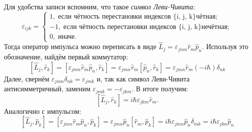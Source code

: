 Для удобства записи вспомним, что такое \textit{символ Леви-Чивита}:
\[
\varepsilon_{ijk} = 
\begin{cases}
    1,\; \text{если чётность перестановки индексов \{i, j, k\} чётная};\\
    -1,\;\text{если чётность перестановки индексов \{i, j, k\} нечётная}; \\
    0,\;\text{иначе}.
\end{cases}
\]
Тогда оператор импульса можно переписать в виде $\hat{L}_j = \varepsilon_{jmn} \hat{r}_m \hat{p}_n$. Используя это обозначение, найдём первый коммутатор:
\[
    [\hat{L}_j, \hat{r}_k] = [\varepsilon_{jmn} \hat{r}_m \hat{p}_n, \hat{r}_k] = \varepsilon_{jmn} \hat{r}_m [\hat{p}_n, \hat{r}_k] = \varepsilon_{jmn}\hat{r}_m(-i\hbar)\delta_{nk}
\]
Далее, свернём $\varepsilon_{jmn}\delta_{nk} = \varepsilon_{jmk}$ и, так как символ Леви-Чивита антисимметричный, заменим $\varepsilon_{jmk} = -\varepsilon_{jkm}$. В итоге получим:
\[
[\hat{L}_j, \hat{r}_k] = i\hbar\varepsilon_{jkm}\hat{r}_m.
\]
Аналогично с импульсом:
\[
[\hat{L}_j, \hat{p}_k] = [\varepsilon_{jmn} \hat{r}_m \hat{p}_n, \hat{p}_k] = \varepsilon_{jmn} \hat{p}_n [\hat{r}_m, \hat{p}_k] = i\hbar\varepsilon_{jmn}\hat{p}_n\delta_{mk} = i\hbar\varepsilon_{jkn}\hat{p}_n
\]

